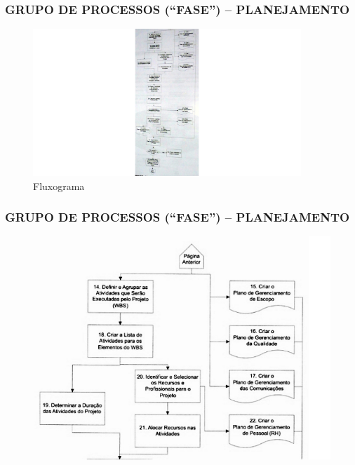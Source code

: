 \begin{frame}
 \frametitle{GRUPO DE PROCESSOS (“FASE”) – PLANEJAMENTO}
  \begin{figure}
   \centering
   \includegraphics[width = 0.9\textwidth]{figs/fig14.png}
   \caption{Fluxograma}
  \end{figure}
\end{frame}

\begin{frame}
 \frametitle{GRUPO DE PROCESSOS (“FASE”) – PLANEJAMENTO}
  \begin{figure}
   \centering
   \includegraphics[height = 0.9\textheight]{figs/fig15.png}
  \end{figure}
\end{frame}

